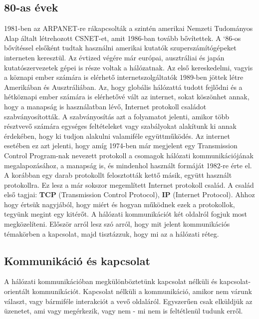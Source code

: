 \documentclass[a4paper, 12pt, oneside]{article}
\begin{document}
\subsection*{80-as évek}

1981-ben az ARPANET-re rákapcsolták a szintén amerikai Nemzeti Tudományos Alap általt létrehozott CSNET-et, amit 1986-ban tovább bővítettek. A `86-os bővítéssel elsőként tudtak használni amerikai kutatók szuperszámítógépeket interneten keresztül. Az évtized végére már európai, ausztráliai és japán kutatószervezetek gépei is része voltak a hálózatnak. Az első kereskedelmi, vagyis a köznapi ember számára is elérhető internetszolgáltatók 1989-ben jöttek létre Amerikában és Ausztráliában.
\bigbreak
Az, hogy globális hálózattá tudott fejlődni és a hétköznapi ember számára is elérhetővé vált az internet, sokat köszönhet annak, hogy a manapság is használatban lévő, Internet protokoll családot szabványosították. A szabványosítás azt a folyamatot jelenti, amikor több résztvevő számára egységes feltételeket vagy szabályokat alakítunk ki annak érdekében, hogy ki tudjon alakulni valamiféle együttműködés. Az internet esetében ez azt jelenti, hogy amíg 1974-ben már megjelent egy Transmission Control Program-nak nevezett protokoll a csomagok hálózati kommunikációjának megalapozásához, a manapság is, és mindenhol használt formáját 1982-re érte el. A korábban egy darab protokollt felosztották kettő másik, együtt használt protokollra. Ez lesz a már sokszor megemlített Internet protokoll család. A család első tagjai: \textbf{TCP} (Transmission Control Protocol), \textbf{IP} (Internet Protocol). Ahhoz hogy értsük nagyjából, hogy miért és hogyan működnek ezek a protokollok, tegyünk megint egy kitérőt. 
\bigbreak
A hálózati kommunikációt két oldalról fogjuk most megközelíteni. Először arról lesz szó arról, hogy mit jelent kommunikációs témakörben a kapcsolat, majd tisztázzuk, hogy mi az a hálózati réteg.

\subsection*{Kommunikáció és kapcsolat}

A hálózati kommunikációban megkülönböztetünk kapcsolat nélküli és kapcsolat-orientált kommunikációt. Kapcsolat nélküli a kommunikáció, amikor nem várunk választ, vagy bármiféle interakciót a vevő oldaláról. Egyszerűen csak elküldjük az üzenetet, ami vagy megérkezik, vagy nem - mi nem is feltétlenül tudunk erről.
\end{document}
